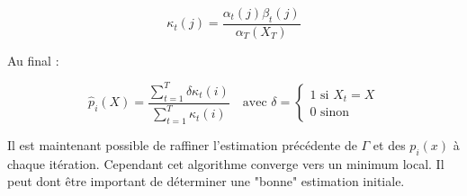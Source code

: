 \documentclass[12pt]{report}
\begin{document}
					\begin{equation}
					\kappa_t(j) = \frac{\alpha_t(j)\beta_t(j)}{\alpha_T(X_T)}
					\end{equation}
					
					Au final :
					
					\begin{equation}
					\hat{p}_i(X) = \frac
					{\sum\limits_{t=1}^T  \delta \kappa_t(i)}
					{\sum\limits_{t=1}^T  \kappa_t(i)}
					\quad \text{avec } \delta=
					\begin{cases}
					1\text{ si }X_t=X \\
					0\text{ sinon}
					\end{cases}
					\end{equation}
					
					Il est maintenant possible de raffiner l'estimation précédente de $\Gamma$ et des $p_i(x)$ à chaque itération. Cependant cet algorithme converge vers un minimum local. Il peut dont être important de déterminer une "bonne" estimation initiale.




\end{document}
